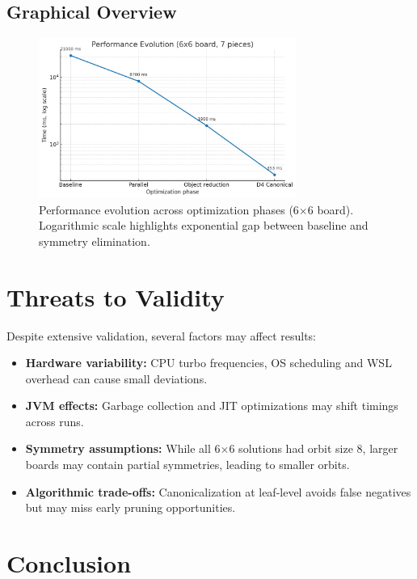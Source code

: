 \documentclass[12pt,a4paper]{article}
\theoremstyle{definition}
\begin{document}
\subsection{Graphical Overview}

\begin{figure}[h]
\centering
\includegraphics[width=0.75\textwidth]{performance_trend.png}
\caption{Performance evolution across optimization phases (6$\times$6 board). 
Logarithmic scale highlights exponential gap between baseline and symmetry elimination.}
\end{figure}

\section{Threats to Validity}

Despite extensive validation, several factors may affect results:

\begin{itemize}
\item \textbf{Hardware variability:} CPU turbo frequencies, OS scheduling and WSL overhead can cause small deviations.
\item \textbf{JVM effects:} Garbage collection and JIT optimizations may shift timings across runs.
\item \textbf{Symmetry assumptions:} While all 6$\times$6 solutions had orbit size 8, larger boards may contain partial symmetries, leading to smaller orbits.
\item \textbf{Algorithmic trade-offs:} Canonicalization at leaf-level avoids false negatives but may miss early pruning opportunities.
\end{itemize}

\section{Conclusion}
\end{document}
